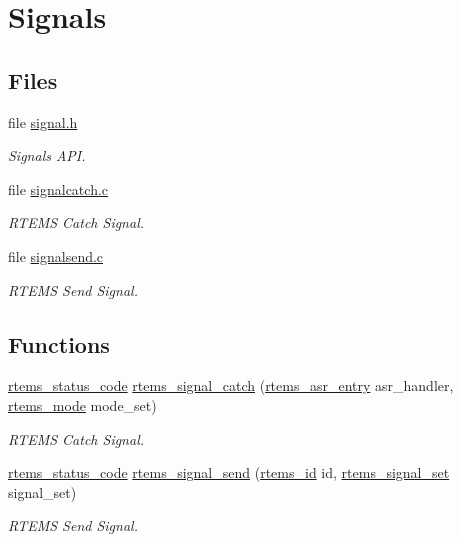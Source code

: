 \hypertarget{group__ClassicSignal}{}\section{Signals}
\label{group__ClassicSignal}
\subsection*{Files}
\begin{DoxyCompactItemize}
\item 
file \mbox{\hyperlink{include_2rtems_2rtems_2signal_8h}{signal.\+h}}
\begin{DoxyCompactList}\small\item\em Signals A\+PI. \end{DoxyCompactList}\item 
file \mbox{\hyperlink{signalcatch_8c}{signalcatch.\+c}}
\begin{DoxyCompactList}\small\item\em R\+T\+E\+MS Catch Signal. \end{DoxyCompactList}\item 
file \mbox{\hyperlink{signalsend_8c}{signalsend.\+c}}
\begin{DoxyCompactList}\small\item\em R\+T\+E\+MS Send Signal. \end{DoxyCompactList}\end{DoxyCompactItemize}
\subsection*{Functions}
\begin{DoxyCompactItemize}
\item 
\mbox{\hyperlink{group__ClassicStatus_ga545d41846817eaba6143d52ee4d9e9fe}{rtems\+\_\+status\+\_\+code}} \mbox{\hyperlink{group__ClassicSignal_ga95ce62db99dce55b9379af057c9bf087}{rtems\+\_\+signal\+\_\+catch}} (\mbox{\hyperlink{group__ClassicASR_ga7277136adc52f70cdfd49c687ce37732}{rtems\+\_\+asr\+\_\+entry}} asr\+\_\+handler, \mbox{\hyperlink{group__ClassicModes_ga8d46a41a837840dc97336fdcd20e4f68}{rtems\+\_\+mode}} mode\+\_\+set)
\begin{DoxyCompactList}\small\item\em R\+T\+E\+MS Catch Signal. \end{DoxyCompactList}\item 
\mbox{\hyperlink{group__ClassicStatus_ga545d41846817eaba6143d52ee4d9e9fe}{rtems\+\_\+status\+\_\+code}} \mbox{\hyperlink{group__ClassicSignal_ga9b10bae66f1a80b2bc7151eb1ce90e23}{rtems\+\_\+signal\+\_\+send}} (\mbox{\hyperlink{group__ClassicTasks_gab20892b814dced7dd4e5b9bf42becd57}{rtems\+\_\+id}} id, \mbox{\hyperlink{group__ClassicASR_gae494c868e6d04d19b2f403bb51de98eb}{rtems\+\_\+signal\+\_\+set}} signal\+\_\+set)
\begin{DoxyCompactList}\small\item\em R\+T\+E\+MS Send Signal. \end{DoxyCompactList}\end{DoxyCompactItemize}


